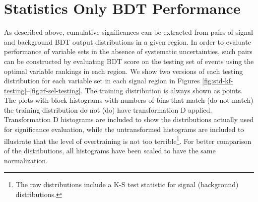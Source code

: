 \section{Statistics Only BDT Performance}
\label{subsec:statonlyperf}
As described above, cumulative significances can be extracted from pairs of signal and background BDT output distributions in a given region.  In order to evaluate performance of variable sets in the absence of systematic uncertainties, such pairs can be constructed by evaluating BDT score on the testing set of events using the optimal variable rankings in each region.  We show two versions of each testing distribution for each variable set in each signal region in Figures \ref{fig:std-kf-testing}--\ref{fig:rf-sel-testing}.  The training distribution is always shown as points.  The plots with block histograms with numbers of bins that match (do not match) the training distribution do not (do) have transformation D applied.  Transformation D histograms are included to show the distributions actually used for significance evaluation, while the untransformed histograms are included to illustrate that the level of overtraining is not too terrible\footnote{The raw distributions include a K-S test statistic for signal (background) distributions.}.  For better comparison of the distributions, all histograms have been scaled to have the same normalization.


